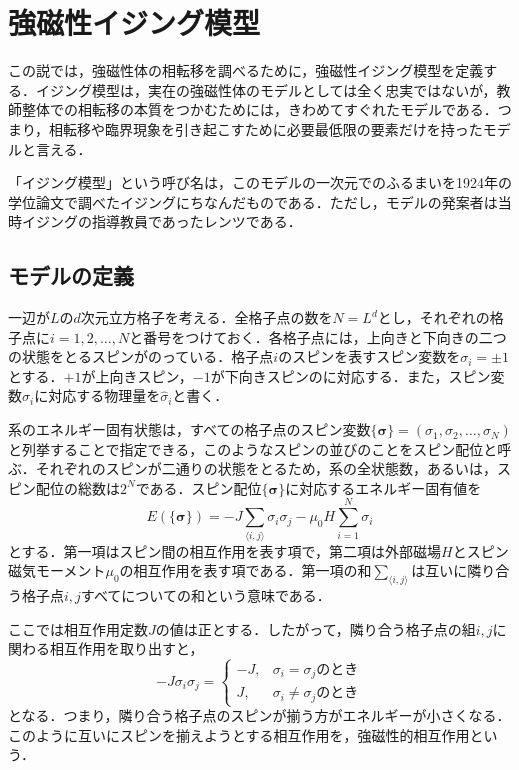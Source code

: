 \documentclass[a4paper,11pt]{jsreport}
\begin{document}
\section{強磁性イジング模型}
この説では，強磁性体の相転移を調べるために，強磁性イジング模型を定義する．イジング模型は，実在の強磁性体のモデルとしては全く忠実ではないが，教師整体での相転移の本質をつかむためには，きわめてすぐれたモデルである．つまり，相転移や臨界現象を引き起こすために必要最低限の要素だけを持ったモデルと言える．\par
「イジング模型」という呼び名は，このモデルの一次元でのふるまいを1924年の学位論文で調べたイジングにちなんだものである．ただし，モデルの発案者は当時イジングの指導教員であったレンツである．\par
\subsection{モデルの定義}
一辺が$L$の$d$次元立方格子を考える．全格子点の数を$N=L^d$とし，それぞれの格子点に$i=1,2,\dots ,N$と番号をつけておく．各格子点には，上向きと下向きの二つの状態をとるスピンがのっている．格子点$i$のスピンを表すスピン変数を$\sigma_i = \pm{1}$とする．$+1$が上向きスピン，$-1$が下向きスピンのに対応する．また，スピン変数$\sigma_i$に対応する物理量を$\hat{\sigma}_i$と書く．\par
系のエネルギー固有状態は，すべての格子点のスピン変数$\{ \bm{\sigma} \} = (\sigma_1, \sigma_2, \dots, \sigma_N)$と列挙することで指定できる，このようなスピンの並びのことをスピン配位と呼ぶ．それぞれのスピンが二通りの状態をとるため，系の全状態数，あるいは，スピン配位の総数は$2^N$である．スピン配位$\{ \bm{\sigma} \}$に対応するエネルギー固有値を
\begin{equation}
  E(\{ \bm{\sigma} \}) = -J \sum_{\langle i, j \rangle} \sigma_i \sigma_j
  - \mu_0 H \sum_{i=1}^{N} \sigma_i \label{イジングエネルギー}
\end{equation}
とする．第一項はスピン間の相互作用を表す項で，第二項は外部磁場$H$とスピン磁気モーメント$\mu_0$の相互作用を表す項である．第一項の和$\sum_{\langle i, j \rangle}$は互いに隣り合う格子点$i,j$すべてについての和という意味である．\par
ここでは相互作用定数$J$の値は正とする．したがって，隣り合う格子点の組$i,j$に関わる相互作用を取り出すと，
\begin{equation}
  -J \sigma_i \sigma_j =
  \begin{cases}
    -J, & \sigma_i = \sigma_j \text{のとき}    \\
    J,  & \sigma_i \neq \sigma_j \text{のとき}
  \end{cases} \label{相互作用項場合分け}
\end{equation}
となる．つまり，隣り合う格子点のスピンが揃う方がエネルギーが小さくなる．このように互いにスピンを揃えようとする相互作用を，強磁性的相互作用という．\par
\end{document}
